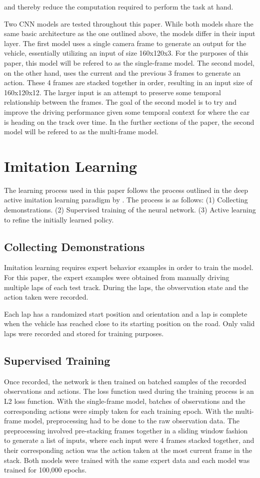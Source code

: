 \documentclass[conference]{IEEEtran}
\begin{document}
and thereby reduce the computation required to perform the task at hand. \par
Two CNN models are tested throughout this paper. While both models share the same basic architecture as the
one outlined above, the models differ in their input layer. The first model uses a single camera frame
to generate an output for the vehicle, essentially utilizing an input of size 160x120x3. For the purposes 
of this paper, this model will be refered to as the single-frame model. The second
model, on the other hand, uses the current and the previous 3 frames to generate an action. These
4 frames are stacked together in order, resulting in an input size of 160x120x12. The larger input 
is an attempt to preserve some temporal relationship between the frames. The goal of the second model is 
to try and improve the driving performance given some temporal context for where the car is heading on the
track over time. In the further sections of the paper, the second model will be refered to as the multi-frame
model.


\section{Imitation Learning}
The learning process used in this paper follows the process outlined in the deep active imitation
learning paradigm by \citet{dagger}. The process is as follows: (1) Collecting demonstrations. 
(2) Supervised training of the neural network. (3) Active learning to refine the initially learned policy.
\subsection{Collecting Demonstrations}
Imitation learning requires expert behavior examples in order to train the model. For this paper, 
the expert examples were obtained from manually driving multiple laps of each test track. During 
the laps, the obvservation state and the action taken were recorded. \par
Each lap has a randomized start position and orientation and a lap is complete when the vehicle has 
reached close to its starting position on the road. Only valid laps were recorded and stored for 
training purposes. 
\subsection{Supervised Training}
Once recorded, the network is then trained on batched samples of the recorded observations and actions.
The loss function used during the training process is an L2 loss function. With the single-frame model,
batches of observations and the corresponding actions were simply taken for each training epoch. 
With the multi-frame model, preprocessing had to be done to the raw observation data. The preprocessing 
involved pre-stacking frames together in a sliding window fashion to generate a list of inputs, where each 
input were 4 frames stacked together, and their corresponding action was the action taken at the most
current frame in the stack. Both models were trained with the same expert data and each model was trained
for 100,000 epochs.
\end{document}
